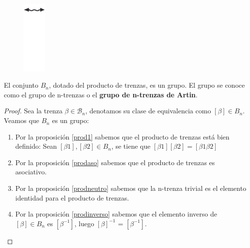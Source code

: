 \documentclass[14pt]{extarticle}
\begin{document}
\begin{figure}[h!]
   	\includegraphics[width=1.2cm]{itrenzas/flechac.png}
   	\caption{}
   	\label{grupo4} 
   \end{figure}

\begin{teo}
	El conjunto ${B}_{n}$, dotado del producto de trenzas, es un grupo. El grupo se conoce como el grupo de n-trenzas o el \textbf{grupo de n-trenzas de Artin}. 
	\begin{proof} Sea la trenza $\beta \in \mathscr{B}_{n}$, denotamos su clase de equivalencia como $[\beta] \in {B}_{n}$. Veamos que  ${B}_{n}$ es un grupo: \\
		\begin{enumerate}
			\item 
			Por la proposición \ref{prod1} sabemos que el producto de trenzas está bien definido: Sean $[\beta1],[\beta2] \in {B}_{n}$, se tiene que $[\beta1][\beta2] = [\beta1\beta2] $
			\item 
			Por la proposición \ref{prodaso} sabemos que el producto de trenzas es asociativo.
			\item 
			Por la proposición \ref{prodneutro} sabemos que la n-trenza trivial es el elemento identidad para el producto de trenzas.
			\item 
			Por la proposición \ref{prodinverso} sabemos que el elemento inverso de  $[\beta] \in {B}_{n}$ es $[\beta^{-1}]$, luego  $[\beta]^{-1}$ =  $[\beta^{-1}]$.
		\end{enumerate}
	\end{proof}
\end{teo}
\end{document}

